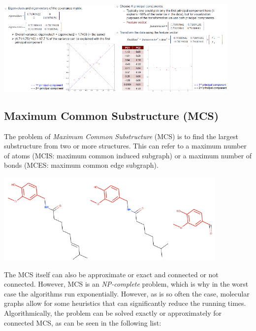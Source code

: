 \begin{center}
    \includegraphics[width=0.45\textwidth]{img/cheminformatics/DimensionalityReduction1.png}\includegraphics[width=0.45\textwidth]{img/cheminformatics/DimensionalityReduction2.png}
\end{center}

\subsection{Maximum Common Substructure (MCS)}

The problem of \emph{Maximum Common Substructure} (MCS) is to find the largest substructure from two or more structures. This can refer to a maximum number of atoms (MCIS: maximum common induced subgraph) or a maximum number of bonds (MCES: maximum common edge subgraph).

\begin{center}
    \includegraphics[width=0.85\textwidth]{img/cheminformatics/McsExample.png}
\end{center}

The MCS itself can also be approximate or exact and connected or not connected. However, MCS is an \emph{NP-complete} problem, which is why in the worst case the algorithms run exponentially. However, as is so often the case, molecular graphs allow for some heuristics that can significantly reduce the running times. Algorithmically, the problem can be solved exactly or approximately for connected MCS, as can be seen in the following list:

